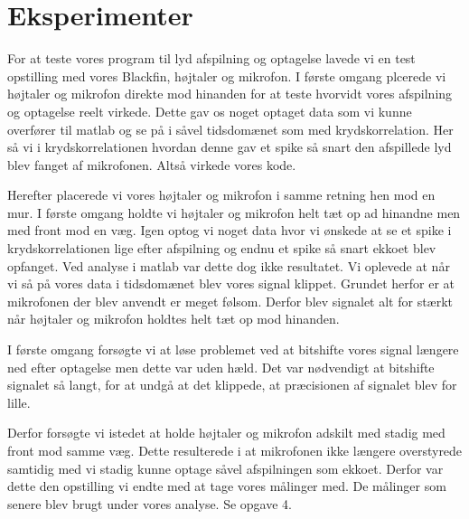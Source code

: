 \graphicspath{{Chapters/Opgave3/}}

\chapter{Eksperimenter}
For at teste vores program til lyd afspilning og optagelse lavede vi en test opstilling med vores Blackfin, højtaler og mikrofon. I første omgang plcerede vi højtaler og mikrofon direkte mod hinanden for at teste hvorvidt vores afspilning og optagelse reelt virkede. Dette gav os noget optaget data som vi kunne overfører til matlab og se på i såvel tidsdomænet som med krydskorrelation. Her så vi i krydskorrelationen hvordan denne gav et spike så snart den afspillede lyd blev fanget af mikrofonen. Altså virkede vores kode. 

Herefter placerede vi vores højtaler og mikrofon i samme retning hen mod en mur. I første omgang holdte vi højtaler og mikrofon helt tæt op ad hinandne men med front mod en væg. Igen optog vi noget data hvor vi ønskede at se et spike i krydskorrelationen lige efter afspilning og endnu et spike så snart ekkoet blev opfanget. Ved analyse i matlab var dette dog ikke resultatet. Vi oplevede at når vi så på vores data i tidsdomænet blev vores signal klippet. Grundet herfor er at mikrofonen der blev anvendt er meget følsom. Derfor blev signalet alt for stærkt når højtaler og mikrofon holdtes helt tæt op mod hinanden. 

I første omgang forsøgte vi at løse problemet ved at bitshifte vores signal længere ned efter optagelse men dette var uden hæld. Det var nødvendigt at bitshifte signalet så langt, for at undgå at det klippede, at præcisionen af signalet blev for lille. 

Derfor forsøgte vi istedet at holde højtaler og mikrofon adskilt med stadig med front mod samme væg. Dette resulterede i at mikrofonen ikke længere overstyrede samtidig med vi stadig kunne optage såvel afspilningen som ekkoet. Derfor var dette den opstilling vi endte med at tage vores målinger med. De målinger som senere blev brugt under vores analyse. Se opgave 4. 

